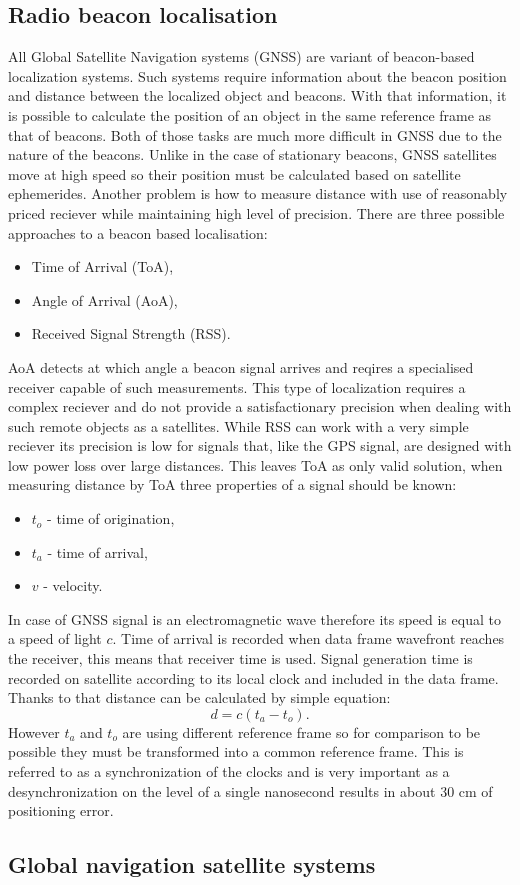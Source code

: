 \subsection{Radio beacon localisation}
All Global Satellite Navigation systems (GNSS) are variant of beacon-based localization
systems\cite{Blewitt1997}. Such systems require information about the beacon position
and distance between the localized object and beacons.
With that information, it is possible to calculate the position of an object in the same reference
frame as that of beacons.
Both of those tasks are much more difficult in GNSS due to the nature of the beacons.
Unlike in the case of stationary beacons, GNSS satellites move at high speed so
their position must be calculated based on satellite ephemerides.
Another problem is how to measure distance with use of reasonably priced reciever while 
maintaining high level of precision.
There are three possible approaches to a beacon based localisation:
\begin{itemize}
	\item Time of Arrival (ToA),
	\item Angle of Arrival (AoA),
	\item Received Signal Strength (RSS).
\end{itemize}
AoA detects at which angle a beacon signal arrives and reqires a specialised receiver capable 
of such measurements. This type of localization requires a complex reciever and do not provide 
a satisfactionary precision when dealing with such remote objects as a satellites.
While RSS can work with a very simple reciever its precision is low for signals that, like
the GPS signal, are designed with low power loss over large distances.
This leaves ToA as only valid solution, when measuring distance by ToA 
three properties of a signal should be known:
\begin{itemize}
	\item $t_o$ - time of origination,
	\item $t_a$ - time of arrival,
	\item $v$ - velocity.
\end{itemize}
In case of GNSS signal is an electromagnetic wave therefore its speed is equal
to a speed of light $c$. Time of arrival is recorded when
data frame wavefront reaches the receiver, this means that receiver time is used.
Signal generation time is recorded on satellite according to its local clock and
included in the data frame. Thanks to that distance can be calculated by simple
equation:
\begin{equation}
	d=c(t_a-t_o).
\end{equation}
However $t_a$ and $t_o$ are using different reference frame so for comparison
to be possible they must be transformed into a common reference frame.
This is referred to as a synchronization of the clocks and is very important as
a desynchronization on the level of a single nanosecond results in about 30 cm of
positioning error\cite{Enge2011}.

\subsection{Global navigation satellite systems}





